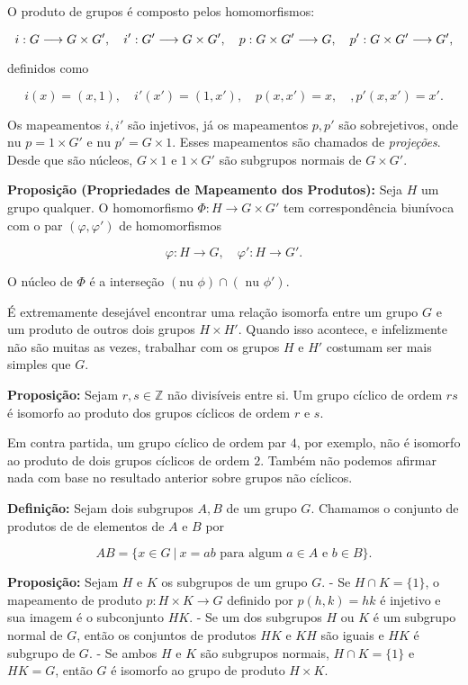 \documentclass[11pt]{article}
\begin{document}
O produto de grupos é composto pelos homomorfismos:

\[i: G\longrightarrow G\times G', \quad i': G'\longrightarrow G\times G', \newline \quad p: G\times G'\longrightarrow G, \quad p': G\times G'\longrightarrow G',\]

definidos como

\[i(x) = (x,1), \quad i'(x') = (1,x'), \quad p(x,x') = x, \quad, p'(x,x') = x'.\]

Os mapeamentos \(i,i'\) são injetivos, já os mapeamentos \(p,p'\) são
sobrejetivos, onde \(\text{nu }p = 1\times G'\) e
\(\text{nu }p' = G\times 1\). Esses mapeamentos são chamados de
\emph{projeções}. Desde que são núcleos, \(G\times 1\) e \(1\times G'\)
são subgrupos normais de \(G\times G'\).

\textbf{Proposição (Propriedades de Mapeamento dos Produtos):} Seja
\(H\) um grupo qualquer. O homomorfismo
\(\Phi: H\longrightarrow G\times G'\) tem correspondência biunívoca com
o par \((\varphi, \varphi')\) de homomorfismos

\[\varphi:H\longrightarrow G, \quad \varphi': H\longrightarrow G'.\]

O núcleo de \(\Phi\) é a interseção
\((\text{nu }\phi)\cap(\text{ nu }\phi').\)

É extremamente desejável encontrar uma relação isomorfa entre um grupo
\(G\) e um produto de outros dois grupos \(H\times H'\). Quando isso
acontece, e infelizmente não são muitas as vezes, trabalhar com os
grupos \(H\) e \(H'\) costumam ser mais simples que \(G\).

\textbf{Proposição:} Sejam \(r,s\in\mathbb{Z}\) não divisíveis entre si.
Um grupo cíclico de ordem \(rs\) é isomorfo ao produto dos grupos
cíclicos de ordem \(r\) e \(s\).

Em contra partida, um grupo cíclico de ordem par \(4\), por exemplo, não
é isomorfo ao produto de dois grupos cíclicos de ordem \(2\). Também não
podemos afirmar nada com base no resultado anterior sobre grupos não
cíclicos.

\textbf{Definição:} Sejam dois subgrupos \(A,B\) de um grupo \(G\).
Chamamos o conjunto de produtos de de elementos de \(A\) e \(B\) por

\[AB = \{x\in G \ | \ x = ab \text{ para algum }a\in A\text{ e }b\in B\}.\]

\textbf{Proposição:} Sejam \(H\) e \(K\) os subgrupos de um grupo \(G\).
- Se \(H\cap K = \{1\}\), o mapeamento de produto
\(p: H\times K\longrightarrow G\) definido por \(p(h,k) = hk\) é
injetivo e sua imagem é o subconjunto \(HK\). - Se um dos subgrupos
\(H\) ou \(K\) é um subgrupo normal de \(G\), então os conjuntos de
produtos \(HK\) e \(KH\) são iguais e \(HK\) é subgrupo de \(G\). - Se
ambos \(H\) e \(K\) são subgrupos normais, \(H\cap K = \{1\}\) e
\(HK = G\), então \(G\) é isomorfo ao grupo de produto \(H\times K\).
\end{document}
